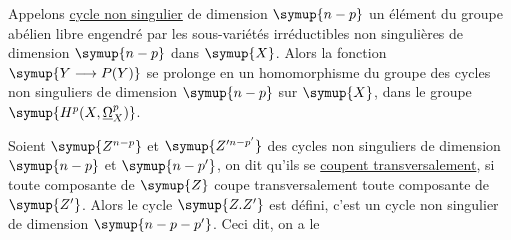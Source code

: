 Appelons \uline{cycle non singulier} de dimension $\symup{n-p}$ un élément du groupe
abélien libre engendré par les sous-variétés irréductibles non singulières de
dimension $\symup{n-p}$ dans $\symup{X}$. Alors la fonction $\symup{Y\longrightarrow P(Y)}$ se prolonge en
un homomorphisme du groupe des cycles non singuliers de dimension $\symup{n-p}$ sur $\symup{X}$,
dans le groupe $\symup{H^{p}(X,\underline{\Omega}_X^{p})}$.

Soient $\symup{Z^{n-p}}$ et $\symup{Z'^{n-p'}}$ des cycles non singuliers de dimension $\symup{n-p}$ et
$\symup{n-p'}$, on dit qu'ils se \uline{coupent transversalement}, si toute composante
de $\symup{Z}$ coupe transversalement toute composante de $\symup{Z'}$. Alors le cycle $\symup{Z.Z'}$ est
défini, c'est un cycle non singulier de dimension $\symup{n-p-p'}$. Ceci dit, on a le

